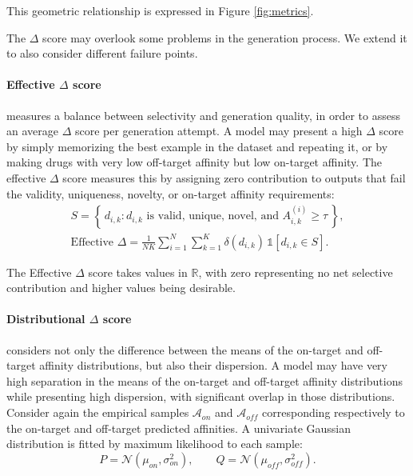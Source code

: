 \documentclass[a4paper,12pt]{article}
\begin{document}
\medskip

This geometric relationship is expressed in Figure \ref{fig:metrics}.

The $\Delta$ score may overlook some problems in the generation process. We extend it to also consider different failure points.

\paragraph{Effective $\Delta$ score} measures a balance between selectivity and generation quality, in order to assess an average $\Delta$ score per generation attempt. A model may present a high $\Delta$ score by simply memorizing the best example in the dataset and repeating it, or by making drugs with very low off-target affinity but low on-target affinity. The effective $\Delta$ score measures this by assigning zero contribution to outputs that fail the validity, uniqueness, novelty, or on-target affinity requirements:
\begin{equation*}
    \begin{gathered}
        S = \left\{\, d_{i,k} :
        d_{i,k} \text{ is valid, unique, novel, and }
        A_{i,k}^{(i)} \geq \tau \,\right\}, \\
        \text{Effective }\Delta
        = \frac{1}{NK}
        \sum_{i=1}^{N}\sum_{k=1}^{K}
        \delta(d_{i,k})\,
        \mathds{1}\!\left[d_{i,k}\in S\right].
    \end{gathered}
\end{equation*}

The Effective $\Delta$ score takes values in $\mathbb{R}$, with zero representing no net selective contribution and higher values being desirable.

\paragraph{Distributional $\Delta$ score}
considers not only the difference between the means of the on-target and off-target affinity distributions, but also their dispersion. A model may have very high separation in the means of the on-target and off-target affinity distributions while presenting high dispersion, with significant overlap in those distributions. Consider again the empirical samples $\mathcal{A}_{on}$ and $\mathcal{A}_{off}$ corresponding respectively to the on-target and off-target predicted affinities. A univariate Gaussian distribution is fitted by maximum likelihood to each sample:
\begin{equation*}
    P = \mathcal{N}(\mu_{on},\sigma_{on}^2),
    \qquad
    Q = \mathcal{N}(\mu_{off},\sigma_{off}^2).
\end{equation*}
\end{document}
